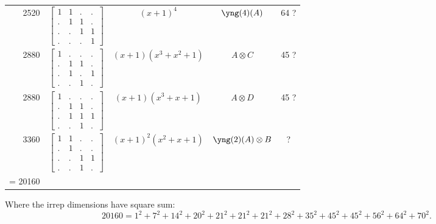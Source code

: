 \documentclass[11pt,oneside]{article}
\newcommand{\tensor}{\otimes}
\begin{document}
\begin{center}
\begin{tabular}{r|l|c|c|c}
2520  & $\begin{bmatrix}1&1&.&.\\.&1&1&.\\.&.&1&1\\.&.&.&1\end{bmatrix}$  & $(x+1)^4$  & $\yng(4)(A)$ & 64 ?  \\
2880  & $\begin{bmatrix}1&.&.&.\\.&1&1&.\\.&1&.&1\\.&.&1&.\end{bmatrix}$
  & $(x+1)(x^3+x^2+1)$  & $A\tensor C$ & 45 ?  \\
2880  & $\begin{bmatrix}1&.&.&.\\.&1&1&.\\.&1&1&1\\.&.&1&.\end{bmatrix}$
  & $(x+1)(x^3+x+1)$  & $A\tensor D$ & 45 ?  \\
3360  & $\begin{bmatrix}1&1&.&.\\.&1&.&.\\.&.&1&1\\.&.&1&.\end{bmatrix}$  & $(x+1)^2(x^2+x+1)$  & $\yng(2)(A)\tensor B$ & ?  \\
\hline
\strut = 20160 \\
\end{tabular}
\end{center}

Where the irrep dimensions have square sum:
$$
 20160 = 1^2 + 7^2 + 14^2 + 20^2 + 21^2 + 21^2 + 21^2 + 28^2 + 35^2 + 45^2 + 45^2 + 56^2 + 64^2 + 70^2.
$$




{}

\end{document}

